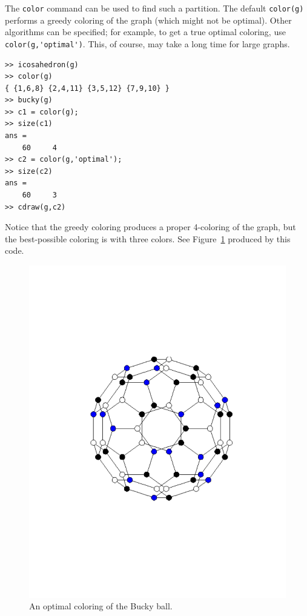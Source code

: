 \documentclass[12pt]{amsart}
\begin{document}
The \verb|color| command can be used to find such a partition. The
default \verb|color(g)| performs a greedy coloring of the graph (which
might not be optimal). Other algorithms can be specified; for example,
to get a true optimal coloring, use \verb|color(g,'optimal')|. This,
of course, may take a long time for large graphs.
\begin{verbatim}
>> icosahedron(g)
>> color(g)
{ {1,6,8} {2,4,11} {3,5,12} {7,9,10} }
>> bucky(g)
>> c1 = color(g);
>> size(c1)
ans =
    60     4
>> c2 = color(g,'optimal');
>> size(c2)
ans =
    60     3
>> cdraw(g,c2)
\end{verbatim}
Notice that the greedy coloring produces a proper 4-coloring of the
graph, but the best-possible coloring is with three colors. See
Figure~\ref{fig:bucky} produced by this code.
\begin{figure}[ht]
  \begin{center}
    \includegraphics[scale=0.5]{figs/bucky}
  \end{center}
  \caption{An optimal coloring of the Bucky ball.}
  \label{fig:bucky}
\end{figure}
\end{document}

